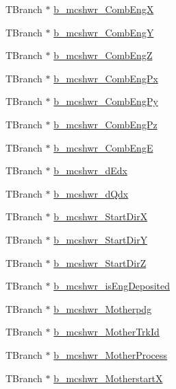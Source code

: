 \begin{DoxyCompactItemize}
\item 
T\-Branch $\ast$ \hyperlink{classanatree_ac04c6ed854dc843c7669464bc9213bfe}{b\-\_\-mcshwr\-\_\-\-Comb\-Eng\-X}
\item 
T\-Branch $\ast$ \hyperlink{classanatree_a8b699bb09b5e8efe0d491f198c7bb17d}{b\-\_\-mcshwr\-\_\-\-Comb\-Eng\-Y}
\item 
T\-Branch $\ast$ \hyperlink{classanatree_adb0b2f599653ea4893edb50eaf646acb}{b\-\_\-mcshwr\-\_\-\-Comb\-Eng\-Z}
\item 
T\-Branch $\ast$ \hyperlink{classanatree_a7f0321710f461fa2e1a0f3e73189dbd5}{b\-\_\-mcshwr\-\_\-\-Comb\-Eng\-Px}
\item 
T\-Branch $\ast$ \hyperlink{classanatree_a76d59f3fbd55ce8baf0813d93da07714}{b\-\_\-mcshwr\-\_\-\-Comb\-Eng\-Py}
\item 
T\-Branch $\ast$ \hyperlink{classanatree_a78b707886390b136e83f8361897d220a}{b\-\_\-mcshwr\-\_\-\-Comb\-Eng\-Pz}
\item 
T\-Branch $\ast$ \hyperlink{classanatree_a8203053f351487a426e1ed9299626dc4}{b\-\_\-mcshwr\-\_\-\-Comb\-Eng\-E}
\item 
T\-Branch $\ast$ \hyperlink{classanatree_aaa57724d50b85e3c964905ecaac4c4b9}{b\-\_\-mcshwr\-\_\-d\-Edx}
\item 
T\-Branch $\ast$ \hyperlink{classanatree_ad8ebcc8a56bab0d99a47cb13d988efb6}{b\-\_\-mcshwr\-\_\-d\-Qdx}
\item 
T\-Branch $\ast$ \hyperlink{classanatree_aec55c54119f47ad907c13579640ad906}{b\-\_\-mcshwr\-\_\-\-Start\-Dir\-X}
\item 
T\-Branch $\ast$ \hyperlink{classanatree_a4460a1575db87d63cda2782ad57b237b}{b\-\_\-mcshwr\-\_\-\-Start\-Dir\-Y}
\item 
T\-Branch $\ast$ \hyperlink{classanatree_aec48d161ed6a33b6355e2f34ef58ea7a}{b\-\_\-mcshwr\-\_\-\-Start\-Dir\-Z}
\item 
T\-Branch $\ast$ \hyperlink{classanatree_aa36739a0cd243fb9786eb10256c1f28e}{b\-\_\-mcshwr\-\_\-is\-Eng\-Deposited}
\item 
T\-Branch $\ast$ \hyperlink{classanatree_a0da88919223088d7cc6b5a52cdaa1c20}{b\-\_\-mcshwr\-\_\-\-Motherpdg}
\item 
T\-Branch $\ast$ \hyperlink{classanatree_a0c2b924c05f4a0c565374f5b4babe628}{b\-\_\-mcshwr\-\_\-\-Mother\-Trk\-Id}
\item 
T\-Branch $\ast$ \hyperlink{classanatree_a43f057eb7884467afa4a17a3e285fa8f}{b\-\_\-mcshwr\-\_\-\-Mother\-Process}
\item 
T\-Branch $\ast$ \hyperlink{classanatree_af0927811ef04a77ee14c25e02e384eff}{b\-\_\-mcshwr\-\_\-\-Motherstart\-X}

\end{DoxyCompactItemize}
